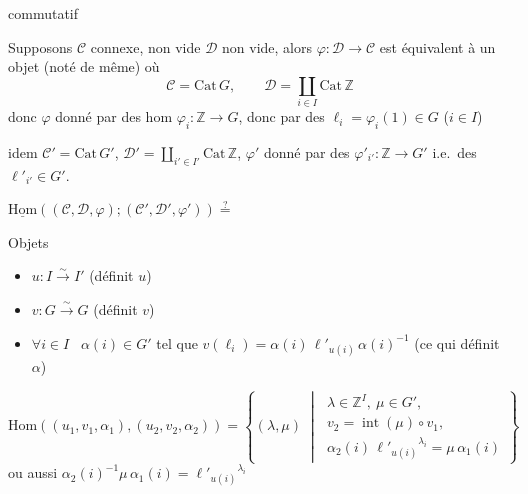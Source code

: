 \documentclass[11pt,a4paper]{article}
\begin{document}
commutatif


Supposons $\mathcal{C}$ connexe, non vide\supplied{,} $\mathcal{D}$ non
vide, alors $\varphi : \mathcal{D} \to \mathcal{C}$ est équivalent à un objet
(noté de même) où
\[
  \mathcal{C} = \mathrm{Cat}\, G , \qquad
  \mathcal{D} = \coprod_{i \in I} \mathrm{Cat}\, \mathbb{Z}
\]
donc $\varphi$ donné par des hom $\varphi_i : \mathbb{Z} \to G$, donc par des
$\ell_i = \varphi_i(1) \in G$ \quad ($i \in I$)

idem \quad $\mathcal{C}' = \mathrm{Cat}\, G'$,
$\mathcal{D}' = \coprod_{i' \in I'} \mathrm{Cat}\, \mathbb{Z}$, $\varphi'$
donné par des $\varphi'_{i'} : \mathbb{Z} \to G'$ i.e.\ des
$\ell'_{i'} \in G'$.

$\underline{\mathrm{Hom}}((\mathcal{C}, \mathcal{D}, \varphi);
(\mathcal{C}', \mathcal{D}', \varphi')) \overset{?}{=}$
\struck{\ill{}}

Objets
\begin{itemize}
  \item $\boxed{u : I \xrightarrow{\sim} I'}$ (définit $u$)
  \item $\boxed{v : G \xrightarrow{\sim} G}$ (définit $v$)
  \item $\forall i \in I$ \ $\boxed{\alpha(i) \in G'}$ tel que
  $\boxed{v(\ell_i) = \alpha(i)\, \ell'_{u(i)}\, \alpha(i)^{-1}}$ (ce qui
  définit $\alpha$)
\end{itemize}

\[
  \mathrm{Hom}((u_1, v_1, \alpha_1), (u_2, v_2, \alpha_2)) =
  \left\{ (\lambda, \mu) \;\middle|\;
  \begin{array}{l}
    \lambda \in \mathbb{Z}^I,\ \mu \in G' , \\
    \boxed{v_2 = \operatorname{int}(\mu) \circ v_1} , \\
    \alpha_2(i)\, {\ell'_{u(i)}}^{\lambda_i} = \mu\, \alpha_1(i)
  \end{array}
  \right\}
\]
ou aussi
$\boxed{\alpha_2(i)^{-1} \mu\, \alpha_1(i) = {\ell'_{u(i)}}^{\lambda_i}}$
\end{document}
